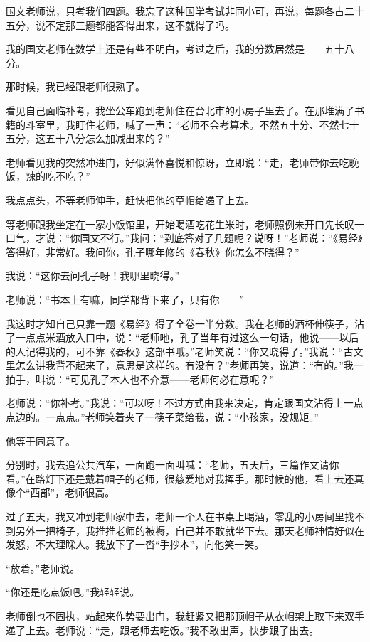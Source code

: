 \par 国文老师说，只考我们四题。我忘了这种国学考试非同小可，再说，每题各占二十五分，说不定那三题都能答得出来，这不就得了吗。
\par 我的国文老师在数学上还是有些不明白，考过之后，我的分数居然是——五十八分。
\par 那时候，我已经跟老师很熟了。
\par 看见自己面临补考，我坐公车跑到老师住在台北市的小房子里去了。在那堆满了书籍的斗室里，我盯住老师，喊了一声：“老师不会考算术。不然五十分、不然七十五分，这五十八分怎么加减出来的？”
\par 老师看见我的突然冲进门，好似满怀喜悦和惊讶，立即说：“走，老师带你去吃晚饭，辣的吃不吃？”
\par 我点点头，不等老师伸手，赶快把他的草帽给递了上去。
\par 等老师跟我坐定在一家小饭馆里，开始喝酒吃花生米时，老师照例未开口先长叹一口气，才说：“你国文不行。”我问：“到底答对了几题呢？说呀！”老师说：“《易经》答得好，非常好。我问你，孔子哪年修的《春秋》你怎么不晓得？”
\par 我说：“这你去问孔子呀！我哪里晓得。”
\par 老师说：“书本上有嘛，同学都背下来了，只有你——”
\par 我这时才知自己只靠一题《易经》得了全卷一半分数。我在老师的酒杯伸筷子，沾了一点点米酒放入口中，说：“老师吔，孔子当年有过这么一句话，他说——以后的人记得我的，可不靠《春秋》这部书哦。”老师笑说：“你又晓得了。”我说：“古文里怎么讲我背不起来了，意思是这样的。有没有？”老师再笑，说道：“有的。”我一拍手，叫说：“可见孔子本人也不介意——老师何必在意呢？”
\par 老师说：“你补考。”我说：“可以呀！不过方式由我来决定，肯定跟国文沾得上一点点边的。一点点。”老师笑着夹了一筷子菜给我，说：“小孩家，没规矩。”
\par 他等于同意了。
\par 分别时，我去追公共汽车，一面跑一面叫喊：“老师，五天后，三篇作文请你看。”在路灯下还是戴着帽子的老师，很慈爱地对我挥手。那时候的他，看上去还真像个“西部”，老师很高。
\par 过了五天，我又冲到老师家中去，老师一个人在书桌上喝酒，零乱的小房间里找不到另外一把椅子，我推推老师的被褥，自己并不敢就坐下去。那天老师神情好似在发怒，不大理睬人。我放下了一沓“手抄本”，向他笑一笑。
\par “放着。”老师说。
\par “你还是吃点饭吧。”我轻轻说。
\par 老师倒也不固执，站起来作势要出门，我赶紧又把那顶帽子从衣帽架上取下来双手递了上去。老师说：“走，跟老师去吃饭。”我不敢出声，快步跟了出去。
